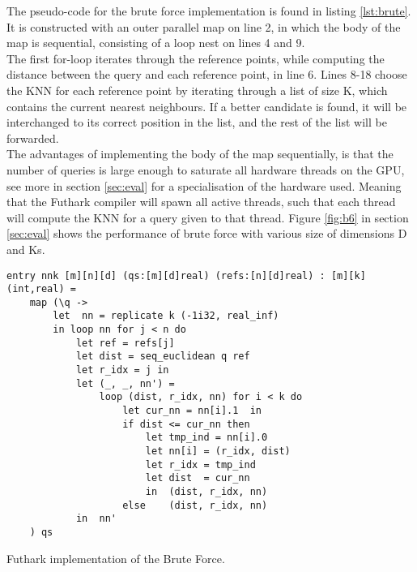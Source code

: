 


The pseudo-code for the brute force implementation is found in listing \ref{lst:brute}. It is constructed with an outer parallel map on line 2, in which the body of the map is sequential, consisting of a loop nest on lines 4 and 9.
\\[2mm]
The first for-loop iterates through the reference points, while computing the distance between the query and each reference point, in line 6. Lines 8-18 choose the KNN for each reference point by iterating through a list of size K, which contains the current nearest neighbours. If a better candidate is found, it will be interchanged to its correct position in the list, and the rest of the list will be forwarded.
\\[2mm]
The advantages of implementing the body of the map sequentially, is that the number of queries is large enough to saturate all hardware threads on the GPU, see more in section \ref{sec:eval} for a specialisation of the hardware used. Meaning that the Futhark compiler will spawn all active threads, such that each thread will compute the KNN for a query given to that thread. Figure \ref{fig:b6} in section \ref{sec:eval} shows the performance of brute force with various size of dimensions D and Ks. 

\begin{listing}[H]
\begin{verbatim}
entry nnk [m][n][d] (qs:[m][d]real) (refs:[n][d]real) : [m][k](int,real) =
    map (\q ->
        let  nn = replicate k (-1i32, real_inf)
        in loop nn for j < n do
            let ref = refs[j]
            let dist = seq_euclidean q ref
            let r_idx = j in
            let (_, _, nn') =
                loop (dist, r_idx, nn) for i < k do
                    let cur_nn = nn[i].1  in
                    if dist <= cur_nn then 
                        let tmp_ind = nn[i].0
                        let nn[i] = (r_idx, dist)
                        let r_idx = tmp_ind
                        let dist  = cur_nn
                        in  (dist, r_idx, nn)
                    else    (dist, r_idx, nn)
            in  nn'
    ) qs
\end{verbatim}
\caption{Futhark implementation of the Brute Force.}
\label{lst:brute}
\end{listing}


